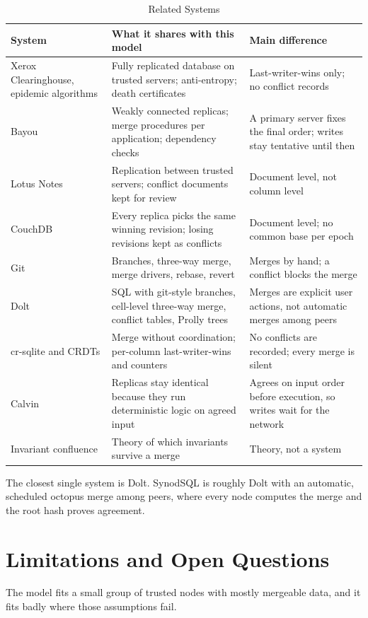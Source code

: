 \documentclass[journal]{IEEEtran}
\newcommand{\SynodSQL}{SynodSQL}
\begin{document}
\begin{table}[t]
\caption{Related Systems}\label{tab:related}
\centering\small
\begin{tabular}{@{}L{4.0cm}L{6.6cm}L{6.4cm}@{}}
\toprule
System & What it shares with this model & Main difference\\
\midrule
Xerox Clearinghouse, epidemic algorithms \cite{demers1987} & Fully replicated database on trusted servers; anti-entropy; death certificates & Last-writer-wins only; no conflict records\\
Bayou \cite{terry1995} & Weakly connected replicas; merge procedures per application; dependency checks & A primary server fixes the final order; writes stay tentative until then\\
Lotus Notes & Replication between trusted servers; conflict documents kept for review & Document level, not column level\\
CouchDB & Every replica picks the same winning revision; losing revisions kept as conflicts & Document level; no common base per epoch\\
Git \cite{chacon2014} & Branches, three-way merge, merge drivers, rebase, revert & Merges by hand; a conflict blocks the merge\\
Dolt \cite{dolt} & SQL with git-style branches, cell-level three-way merge, conflict tables, Prolly trees & Merges are explicit user actions, not automatic merges among peers\\
cr-sqlite and CRDTs \cite{shapiro2011,crsqlite} & Merge without coordination; per-column last-writer-wins and counters & No conflicts are recorded; every merge is silent\\
Calvin \cite{thomson2012} & Replicas stay identical because they run deterministic logic on agreed input & Agrees on input order before execution, so writes wait for the network\\
Invariant confluence \cite{bailis2014} & Theory of which invariants survive a merge & Theory, not a system\\
\bottomrule
\end{tabular}
\end{table}

The closest single system is Dolt. \SynodSQL{} is roughly Dolt with an automatic, scheduled octopus merge among peers, where every node computes the merge and the root hash proves agreement.

\section{Limitations and Open Questions}\label{sec:limits}
The model fits a small group of trusted nodes with mostly mergeable data, and it fits badly where those assumptions fail.
\end{document}
